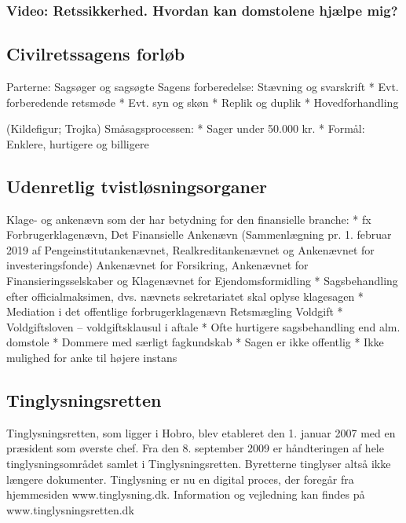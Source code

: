 \documentclass[]{book}
\begin{document}
\hypertarget{video-retssikkerhed.-hvordan-kan-domstolene-hjlpe-mig}{%
\subsubsection{Video: Retssikkerhed. Hvordan kan domstolene hjælpe mig?}\label{video-retssikkerhed.-hvordan-kan-domstolene-hjlpe-mig}}

\hypertarget{civilretssagens-forlb}{%
\subsection{Civilretssagens forløb}\label{civilretssagens-forlb}}

Parterne: Sagsøger og sagsøgte
Sagens forberedelse:
Stævning og svarskrift
* Evt. forberedende retsmøde
* Evt. syn og skøn
* Replik og duplik
* Hovedforhandling

(Kildefigur; Trojka)
Småsagsprocessen:
* Sager under 50.000 kr.
* Formål: Enklere, hurtigere og billigere

\hypertarget{udenretlig-tvistlsningsorganer}{%
\subsection{Udenretlig tvistløsningsorganer}\label{udenretlig-tvistlsningsorganer}}

Klage- og ankenævn som der har betydning for den finansielle branche:
* fx Forbrugerklagenævn, Det Finansielle Ankenævn (Sammenlægning pr. 1. februar 2019 af Pengeinstitutankenævnet, Realkreditankenævnet og Ankenævnet for investeringsfonde) Ankenævnet for Forsikring, Ankenævnet for Finansieringsselskaber og Klagenævnet for Ejendomsformidling
* Sagsbehandling efter officialmaksimen, dvs. nævnets sekretariatet skal oplyse klagesagen
* Mediation i det offentlige forbrugerklagenævn
Retsmægling
Voldgift
* Voldgiftsloven -- voldgiftsklausul i aftale
* Ofte hurtigere sagsbehandling end alm. domstole
* Dommere med særligt fagkundskab
* Sagen er ikke offentlig
* Ikke mulighed for anke til højere instans

\hypertarget{tinglysningsretten}{%
\subsection{Tinglysningsretten}\label{tinglysningsretten}}

Tinglysningsretten, som ligger i Hobro, blev etableret den 1. januar 2007 med en præsident som øverste chef.
Fra den 8. september 2009 er håndteringen af hele tinglysningsområdet samlet i Tinglysningsretten. Byretterne tinglyser altså ikke længere dokumenter.
Tinglysning er nu en digital proces, der foregår fra hjemmesiden www.tinglysning.dk.
Information og vejledning kan findes på www.tinglysningsretten.dk
\end{document}
